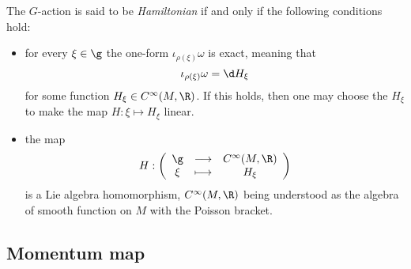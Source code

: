 \documentclass{worksheetclass}
\begin{document}
        \begin{defn}
            The $G$-action is said to be \emph{Hamiltonian} if and only if the following conditions hold:
            \begin{itemize}
                \item for every $\xi\in\g$ the one-form $\iota_{\rho(\xi)}\omega$ is exact, meaning that
                \begin{equation}
                    \iota_{\rho(\xi)}\omega=\d H_{\xi}
                \end{equation}
                for some function $H_{\xi}\in C^\infty(M,\R)$. If this holds, then one may choose the $H_\xi$ to make the map $H:\xi\mapsto H_\xi$ linear.
                \item the map
                \begin{equation}
                    H:\left(
                    \begin{array}{ccc}
                            \g & \longrightarrow & C^\infty(M,\R) \\
                            \xi & \longmapsto & H_\xi
                    \end{array}
                    \right)
                \end{equation}
                is a Lie algebra homomorphism, $C^\infty(M,\R)$ being understood as the algebra of smooth function on $M$ with the Poisson bracket.
            \end{itemize}
        \end{defn}

    \subsection{Momentum map}
        
\end{document}
